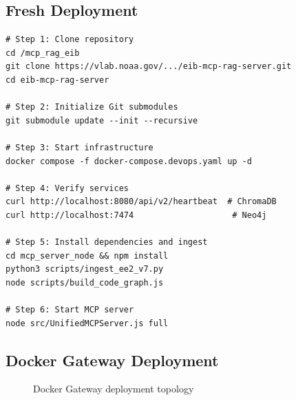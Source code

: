 \documentclass[11pt,letterpaper,twoside]{article}
\begin{document}
\subsection{Fresh Deployment}

\begin{lstlisting}[style=bashstyle, caption={Complete deployment sequence}]
# Step 1: Clone repository
cd /mcp_rag_eib
git clone https://vlab.noaa.gov/.../eib-mcp-rag-server.git
cd eib-mcp-rag-server

# Step 2: Initialize Git submodules
git submodule update --init --recursive

# Step 3: Start infrastructure
docker compose -f docker-compose.devops.yaml up -d

# Step 4: Verify services
curl http://localhost:8080/api/v2/heartbeat  # ChromaDB
curl http://localhost:7474                    # Neo4j

# Step 5: Install dependencies and ingest
cd mcp_server_node && npm install
python3 scripts/ingest_ee2_v7.py
node scripts/build_code_graph.js

# Step 6: Start MCP server
node src/UnifiedMCPServer.js full
\end{lstlisting}

\subsection{Docker Gateway Deployment}

\begin{figure}[H]
\centering
{}
\caption{Docker Gateway deployment topology}
\end{figure}
\end{document}
